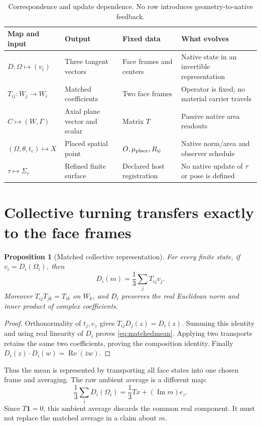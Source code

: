 \documentclass[11pt,a4paper]{article}
\numberwithin{equation}{section}
\newtheorem{proposition}{Proposition}[section]
\theoremstyle{definition}
\theoremstyle{remark}
\newcommand{\one}{\mathbf 1}
\newcommand{\re}{\operatorname{Re}}
\newcommand{\im}{\operatorname{Im}}
\newcommand{\muplace}{\mu_{\rm place}}
\begin{document}
\begin{table}[htbp]
\centering\small
\caption{Correspondence and update dependence. No row introduces
geometry-to-native feedback.}
\begin{tabularx}{\linewidth}{@{}p{.19\linewidth}XXX@{}}
\toprule
Map and input & Output & Fixed data & What evolves\\\midrule
$D:\Omega\mapsto(v_i)$ & Three tangent vectors & Face frames and centers
  & Native state in an invertible representation\\
$T_{ij}:W_j\to W_i$ & Matched coefficients & Two face frames
  & Operator is fixed; no material carrier travels\\
$C\mapsto(W,\Gamma)$ & Axial plane vector and scalar & Matrix $T$
  & Passive native area readouts\\
$(\Omega,\theta,t_c)\mapsto X$ & Placed spatial point & $O,\muplace,R_\psi$
  & Native norm/area and observer schedule\\
$\tau\mapsto\Sigma_\tau$ & Refined finite surface & Declared host registration
  & No native update of $\tau$ or pose is defined\\
\bottomrule
\end{tabularx}
\label{tab:types}
\end{table}

\section{Collective turning transfers exactly to the face frames}
\label{sec:turn}

\begin{proposition}[Matched collective representation]\label{prop:mean}
For every finite state, if $v_i=D_i(\Omega_i)$, then
\begin{equation}\label{eq:matchedmean}
\boxed{D_i(m)=\frac13\sum_jT_{ij}v_j.}
\end{equation}
Moreover $T_{ij}T_{jk}=T_{ik}$ on $W_k$, and $D_i$ preserves the real
Euclidean norm and inner product of complex coefficients.
\end{proposition}
\begin{proof}
Orthonormality of $t_j,e_z$ gives $T_{ij}D_j(z)=D_i(z)$. Summing this
identity and using real linearity of $D_i$ proves \eqref{eq:matchedmean}.
Applying two transports retains the same two coefficients, proving the
composition identity. Finally
$D_i(z)\cdot D_i(w)=\re(\bar z w)$.
\end{proof}

Thus the mean is represented by transporting all face states into one
chosen frame and averaging. The raw ambient average is a different map:
\begin{equation}
\frac13\sum_iD_i(\Omega_i)
=\frac13Tx+(\im m)e_z.
\end{equation}
Since $T\one=0$, this ambient average discards the common real component.
It must not replace the matched average in a claim about $m$.
\end{document}
